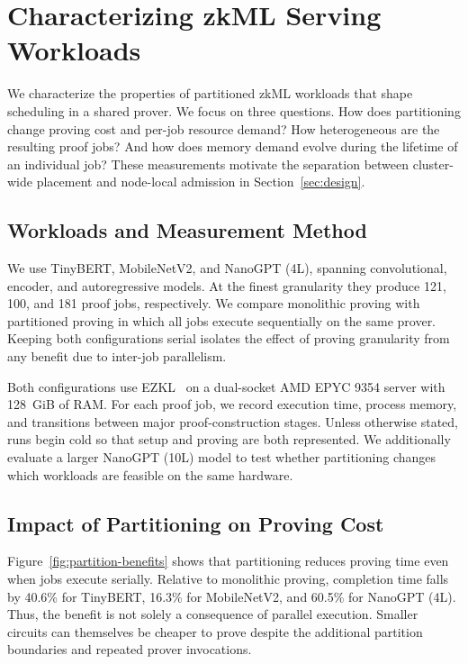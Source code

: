 \providecommand{\zkTBC}[1]{\textbf{[TO COMPLETE: #1]}}

\section{Characterizing zkML Serving Workloads}
\label{sec:characterization}

We characterize the properties of partitioned zkML workloads that shape scheduling in a shared prover. We focus on three questions. How does partitioning change proving cost and per-job resource demand? How heterogeneous are the resulting proof jobs? And how does memory demand evolve during the lifetime of an individual job? These measurements motivate the separation between cluster-wide placement and node-local admission in Section~\ref{sec:design}.

\subsection{Workloads and Measurement Method}
\label{sec:characterization-method}

We use TinyBERT, MobileNetV2, and NanoGPT (4L), spanning convolutional, encoder, and autoregressive models. At the finest granularity they produce 121, 100, and 181 proof jobs, respectively. We compare monolithic proving with partitioned proving in which all jobs execute sequentially on the same prover. Keeping both configurations serial isolates the effect of proving granularity from any benefit due to inter-job parallelism.

Both configurations use EZKL~\cite{ezkl} on a dual-socket AMD EPYC 9354 server with 128~GiB of RAM. For each proof job, we record execution time, process memory, and transitions between major proof-construction stages. Unless otherwise stated, runs begin cold so that setup and proving are both represented. We additionally evaluate a larger NanoGPT (10L) model to test whether partitioning changes which workloads are feasible on the same hardware.

\subsection{Impact of Partitioning on Proving Cost}
\label{sec:decomposition-benefit}

Figure~\ref{fig:partition-benefits} shows that partitioning reduces proving time even when jobs execute serially. Relative to monolithic proving, completion time falls by 40.6\% for TinyBERT, 16.3\% for MobileNetV2, and 60.5\% for NanoGPT (4L). Thus, the benefit is not solely a consequence of parallel execution. Smaller circuits can themselves be cheaper to prove despite the additional partition boundaries and repeated prover invocations.

